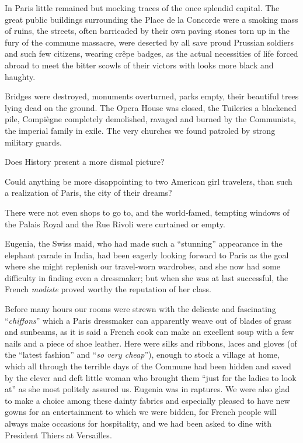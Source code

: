 \documentclass[12pt]{book}
\begin{document}
In Paris little remained but mocking traces of the once splendid capital. The
great public buildings surrounding the Place de la Concorde were a smoking
mass of ruins, the streets, often barricaded by their own paving stones torn up
in the fury of the commune massacre, were deserted by all save proud Prussian
soldiers and such few citizens, wearing crêpe badges, as the actual necessities of
life forced abroad to meet the bitter scowls of their victors with looks more black
and haughty.

Bridges were destroyed, monuments overturned, parks empty, their beautiful
trees lying dead on the ground. The Opera House was closed, the Tuileries a
blackened pile, Compiègne completely demolished, ravaged and burned by the
Communists, the imperial family in exile. The very churches we found patroled
by strong military guards.

Does History present a more dismal picture?

Could anything be more disappointing to two American girl travelers, than
such a realization of Paris, the city of their dreams?

There were not even shops to go to, and the world‐famed, tempting windows
of the Palais Royal and the Rue Rivoli were curtained or empty.

Eugenia, the Swiss maid, who had made such a “stunning” appearance in the
elephant parade in India, had been eagerly looking forward to Paris as the goal
where she might replenish our travel‐worn wardrobes, and she now had some
difficulty in finding even a dressmaker; but when she was at last successful, the
French {\it modiste} proved worthy the reputation of her class.

Before many hours our rooms were strewn with the delicate and fascinating
“{\it chiffons}” which a Paris dressmaker can apparently weave out of blades of grass
and sunbeams, as it is said a French cook can make an excellent soup with a few
nails and a piece of shoe leather. Here were silks and ribbons, laces and gloves (of
the “latest fashion” and “{\it so very cheap}”), enough to stock a village at home, which
all through the terrible days of the Commune had been hidden and saved by the
clever and deft little woman who brought them “just for the ladies to look at” as
she most politely assured us. Eugenia was in raptures. We were also glad to make
a choice among these dainty fabrics and especially pleased to have new gowns
for an entertainment to which we were bidden, for French people will always
make occasions for hospitality, and we had been asked to dine with President
Thiers at Versailles.
\end{document}
